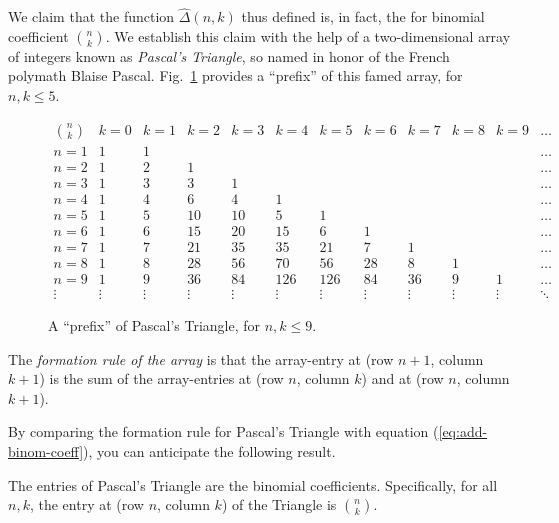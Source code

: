 We claim that the function $\hat{\Delta}(n,k)$ thus defined is, in
fact, the for binomial coefficient $\displaystyle {n \choose k}$.  We
establish this claim with the help of a two-dimensional array of
integers known as {\it Pascal's Triangle},
so named in honor of the French polymath Blaise Pascal.
Fig.~\ref{fig:pascal-triangle} provides a ``prefix'' of this famed
array, for $n,k \leq 5$.
\begin{figure}[htb]
\[
\begin{array}{c||r|r|r|r|r|r|r|r|r|r|r}
{\displaystyle {n \choose k}} & k=0 & k=1 & k=2 & k=3 & k=4 & k=5 &
k=6 & k=7 & k=8 & k=9 & \ldots \\
\hline
\hline
n=1 & 1 & 1 &    &    &     &     &    &    &   &   & \ldots \\
\hline
n=2 & 1 & 2 &  1 &    &     &     &    &    &   &   & \ldots \\
\hline
n=3 & 1 & 3 &  3 &  1 &     &     &    &    &   &   & \ldots \\
\hline
n=4 & 1 & 4 &  6 &  4 &   1 &     &    &    &   &   & \ldots \\
\hline
n=5 & 1 & 5 & 10 & 10 &   5 &   1 &    &    &   &   & \ldots \\
\hline
n=6 & 1 & 6 & 15 & 20 &  15 &   6 &  1 &    &   &   & \ldots \\
\hline
n=7 & 1 & 7 & 21 & 35 &  35 &  21 &  7 &  1 &   &   & \ldots \\
\hline
n=8 & 1 & 8 & 28 & 56 &  70 &  56 & 28 &  8 & 1 &   & \ldots \\
\hline
n=9 & 1 & 9 & 36 & 84 & 126 & 126 & 84 & 36 & 9 & 1 & \ldots \\
\hline
\vdots &\vdots &\vdots &\vdots &\vdots &\vdots &\vdots &\vdots &\vdots
&\vdots &\vdots &\ddots
\end{array}
\] 
\caption{A ``prefix'' of Pascal's Triangle, for $n,k \leq 9$.}
\label{fig:pascal-triangle}
\end{figure}
The {\em formation rule of the array} is that the array-entry at (row
$n+1$, column $k+1$) is the sum of the array-entries at (row $n$, column
$k$) and at (row $n$, column $k+1$).

\medskip

By comparing the formation rule for Pascal's Triangle with equation
(\ref{eq:add-binom-coeff}), you can anticipate the following result.

\begin{prop}
\label{thm:pascal-binom}
The entries of Pascal's Triangle are the binomial coefficients.
Specifically, for all $n,k$, the entry at (row $n$, column $k$) of the
Triangle is $\displaystyle {n \choose k}$.
\end{prop}

